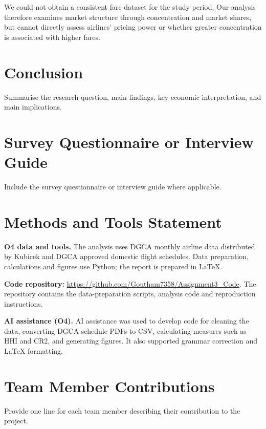 \documentclass[12pt,a4paper]{article}
\begin{document}
We could not obtain a consistent fare dataset for the study period. Our analysis therefore examines market structure through concentration and market shares, but cannot directly assess airlines' pricing power or whether greater concentration is associated with higher fares.

\section{Conclusion}
Summarise the research question, main findings, key economic interpretation, and main implications.

\newpage
\nocite{kubicek2026aviationstats,dgcaDomesticSchedules}
\printbibliography[title={References}]
\clearpage


\newpage
\appendix



\clearpage
\section{Survey Questionnaire or Interview Guide}
Include the survey questionnaire or interview guide where applicable.

\newpage
\section*{Methods and Tools Statement}
\textbf{O4 data and tools.} The analysis uses DGCA monthly airline data distributed by Kubicek and DGCA approved domestic flight schedules. Data preparation, calculations and figures use Python; the report is prepared in LaTeX.

\textbf{Code repository:} \href{https://github.com/Goutham7358/Assignment3_Code}{https://github.com/Goutham7358/Assignment3\_Code}. The repository contains the data-preparation scripts, analysis code and reproduction instructions.

\textbf{AI assistance (O4).} AI assistance was used to develop code for cleaning the data, converting DGCA schedule PDFs to CSV, calculating measures such as HHI and CR2, and generating figures. It also supported grammar correction and LaTeX formatting.


\section*{Team Member Contributions}
Provide one line for each team member describing their contribution to the project.
\end{document}
